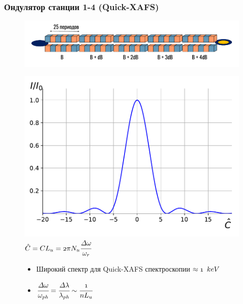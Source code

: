\documentclass[14pt, hyperref = {colorlinks}]{beamer}
\begin{document}
\small
\begin{frame}
\frametitle{Ондулятор станции 1-4 (Quick-XAFS)}\label{t1}
\vspace{-10pt}
\begin{figure}[h]
	\raggedright{\includegraphics[width=0.99\linewidth]{pic/und.pdf}}
\end{figure}
\vspace{-25pt}
\begin{figure}[h]
	\begin{minipage}[h]{0.49\linewidth}
		\includegraphics[width=0.99\linewidth]{pic/spec_C.pdf}\\
		\tiny{$\mathnormal{\hat{C} = CL_u = 2\pi N_u\cfrac{\Delta\omega}{\omega_r}}$}
	\end{minipage}	
	\begin{minipage}[h]{0.49\linewidth}
	    \begin{itemize}
		\item {Широкий спектр для Quick-XAFS  спектроскопии $\mathnormal{\approx 1}$ $\mathnormal{keV}$}
		\item {$\mathnormal{\cfrac{\Delta \omega}{\omega_{ph}} = \cfrac{\Delta \lambda}{\lambda_{ph}} \sim \cfrac{1}{nL_u}}$}
		\end{itemize}
	\end{minipage}
\end{figure}
\end{frame}
\end{document}
